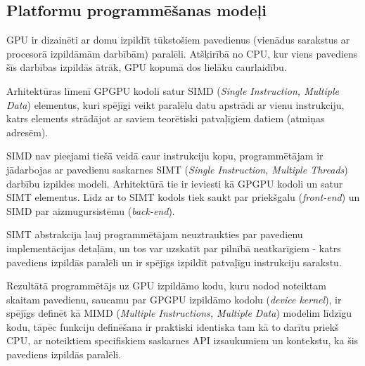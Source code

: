 \begin{center}
    \chapter{Platformu programmēšanas modeļi}
\end{center}
GPU ir dizainēti ar domu izpildīt tūkstošiem pavedienus (vienādus sarakstus ar
procesorā izpildāmām darbībām) paralēli. Atšķirībā no CPU, kur viens pavediens
šīs darbības izpildās ātrāk, GPU kopumā dos lielāku caurlaidību.

Arhitektūras līmenī GPGPU kodoli satur SIMD (\textit{Single Instruction,
Multiple Data}) elementus, kuri spējīgi veikt paralēlu datu apstrādi ar vienu
instrukciju, katrs elements strādājot ar saviem teorētiski patvaļīgiem datiem
(atmiņas adresēm).

SIMD nav pieejami tiešā veidā caur instrukciju kopu, programmētājam ir
jādarbojas ar pavedienu saskarnes SIMT (\textit{Single Instruction, Multiple
Threads}) darbību izpildes modeli. \cite{GPGPU_gramata} Arhitektūrā tie ir
ieviesti kā GPGPU kodoli un satur SIMT elementus. Līdz ar to SIMT kodols tiek
saukt par priekšgalu (\textit{front-end}) un SIMD par aizmugursistēmu
(\textit{back-end}).

SIMT abstrakcija ļauj programmētājam neuztraukties par pavedienu
implementācijas detaļām, un tos var uzskatīt par pilnībā neatkarīgiem - katrs
pavediens izpildās paralēli un ir spējīgs izpildīt patvaļīgu instrukciju
sarakstu.

Rezultātā programmētājs uz GPU izpildāmo kodu, kuru nodod noteiktam skaitam
pavedienu, saucamu par  GPGPU izpildāmo kodolu (\textit{device kernel}), ir
spējīgs definēt kā MIMD (\textit{Multiple Instructions, Multiple Data}) modelim
līdzīgu kodu, tāpēc funkciju definēšana ir praktiski identiska tam kā to darītu
priekš CPU, ar noteiktiem specifiskiem saskarnes API izsaukumiem un kontekstu,
ka šis pavediens izpildās paralēli. \cite{kursa-darbs}

